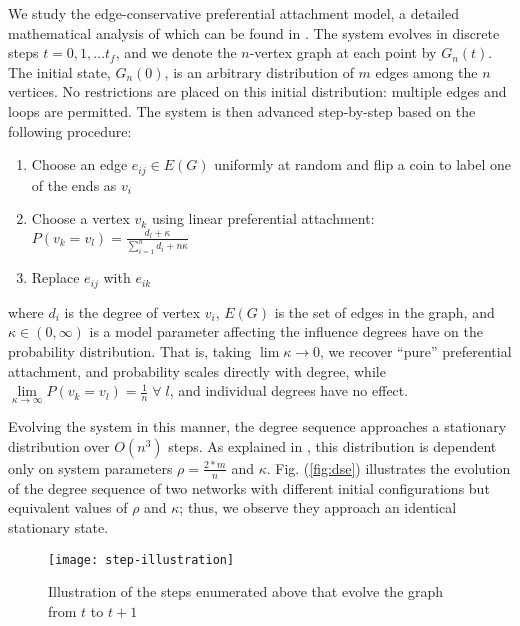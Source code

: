 \documentclass[12pt]{article}
\newcommand\ignore[1]{}
\begin{document}
\begin{onehalfspace}
We study the edge-conservative preferential attachment model, a detailed mathematical analysis of which can be found in \cite{rath_time_2009}. The system evolves in discrete steps $t = 0,1,\ldots t_f$, and we denote the $n$-vertex graph at each point by $G_n(t)$. The initial state, $G_n(0)$, is an arbitrary distribution of $m$ edges among the $n$ vertices. No restrictions are placed on this initial distribution: multiple edges and loops are permitted.\ignore{an Erd\H{o}s-R\'{e}nyi random graph on $n$ vertices and $m$ edges. Here, however, $m$ may be larger than the total number of edges in a completely-connected $n$-vertex graph so we cannot assign a probability to each edges existence, instead placing $m$ edges at random in the graph.} The system is then advanced step-by-step based on the following procedure:

\begin{enumerate}
\item Choose an edge $e_{ij} \in E(G)$ uniformly at random and flip a coin to label one of the ends as $v_{i}$
\item Choose a vertex $v_{k}$ using linear preferential attachment: $P(v_{k} = v_{l}) = \frac{d_{l} + \kappa}{\sum\limits_{i=1}^{n} d_{i} + n \kappa}$
\item Replace $e_{ij}$ with $e_{ik}$
\end{enumerate}

\noindent where $d_i$ is the degree of vertex $v_i$, $E(G)$ is the set of edges in the graph, and $\kappa \in (0, \infty)$ is a model parameter affecting the influence degrees have on the probability distribution. That is, taking $\lim\limits{\kappa \rightarrow 0}$, we recover ``pure'' preferential attachment, and probability scales directly with degree, while $\lim\limits_{\kappa \rightarrow \infty} P(v_k = v_l) = \frac{1}{n} \; \forall \; l$, and individual degrees have no effect. \par

Evolving the system in this manner, the degree sequence approaches a stationary distribution over $O(n^3)$ steps. As explained in \cite{rath_time_2009}, this distribution is dependent only on system parameters $\rho = \frac{2*m}{n}$ and $\kappa$. Fig. (\ref{fig:dse}) illustrates the evolution of the degree sequence of two networks with different initial configurations but equivalent values of $\rho$ and $\kappa$; thus, we observe they approach an identical stationary state.

\begin{figure}[ht!]
  \centering
  \texttt{[image: step-illustration]}
  \caption{Illustration of the steps enumerated above that evolve the graph from $t$ to $t+1$ \label{fig:step-illustration}}
\end{figure}


\end{onehalfspace}
\end{document}
